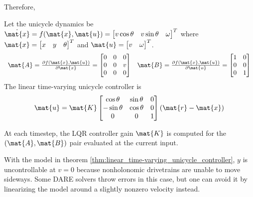 Therefore,
\begin{theorem}
  \label{thm:linear_time-varying_unicycle_controller}

  Let the unicycle dynamics be
  $\dot{\mat{x}} = f(\mat{x}, \mat{u}) =
  \begin{bmatrix}
    v\cos\theta &
    v\sin\theta &
    \omega
  \end{bmatrix}^T$ where
  $\mat{x} =
  \begin{bmatrix}
    x &
    y &
    \theta
  \end{bmatrix}^T$ and
  $\mat{u} =
  \begin{bmatrix}
    v &
    \omega
  \end{bmatrix}^T$.
  \begin{equation}
    \begin{array}{cc}
      \mat{A} = \frac{\partial f(\mat{x}, \mat{u})}{\partial\mat{x}} =
      \begin{bmatrix}
        0 & 0 & 0 \\
        0 & 0 & v \\
        0 & 0 & 0
      \end{bmatrix} &
      \mat{B} = \frac{\partial f(\mat{x}, \mat{u})}{\partial\mat{u}} =
      \begin{bmatrix}
        1 & 0 \\
        0 & 0 \\
        0 & 1
      \end{bmatrix}
    \end{array}
  \end{equation}
  The linear time-varying unicycle controller is
  \begin{equation}
    \mat{u} = \mat{K}
    \begin{bmatrix}
      \cos\theta & \sin\theta & 0 \\
      -\sin\theta & \cos\theta & 0 \\
      0 & 0 & 1
    \end{bmatrix}
    (\mat{r} - \mat{x})
  \end{equation}

  At each timestep, the LQR controller gain $\mat{K}$ is computed for the
  $(\mat{A}, \mat{B})$ pair evaluated at the current input.
\end{theorem}

With the \gls{model} in theorem
\ref{thm:linear_time-varying_unicycle_controller}, $y$ is uncontrollable at
$v = 0$ because nonholonomic drivetrains are unable to move sideways. Some DARE
solvers throw errors in this case, but one can avoid it by linearizing the model
around a slightly nonzero velocity instead.

